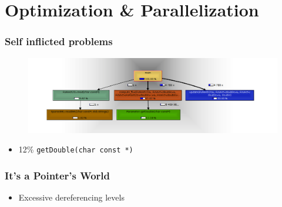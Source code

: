 \documentclass{beamer}
\begin{document}
\section{Optimization \& Parallelization}
\begin{frame}
	\frametitle{Self inflicted problems}

\begin{figure}
\begin{center}
\includegraphics[width=\textwidth]{images/no_output.png}
\end{center}
\end{figure}

\begin{center}
\parbox{0.5\textwidth}{
\begin{itemize}
\item{12\% \texttt{\smaller getDouble(char const *)}}
\end{itemize}
}
\end{center}
\end{frame}







\begin{frame}
	\frametitle{It's a Pointer's World}



\begin{center}
\parbox{0.5\textwidth}{

\begin{itemize}
\item{Excessive dereferencing levels}
\end{itemize}
}
\end{center}

\end{frame}
\end{document}
